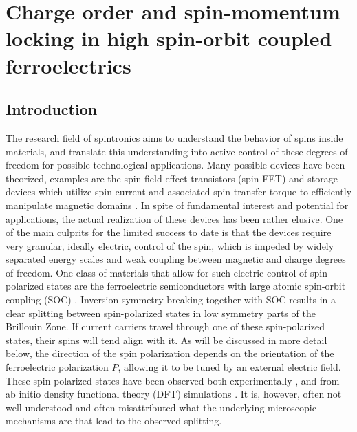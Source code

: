 \newcommand{\unkr}{$u_n(\bm{k}, \bm{r})$}
\newcommand{\Unkr}{u_n(\bm{k}, \bm{r})}
\newcommand{\eikr}{$e^{i\bm{k}\cdot\bm{r}}$}
\newcommand{\Eikr}{e^{i\bm{k}\cdot\bm{r}}}
\chapter{Charge order and spin-momentum locking in high spin-orbit coupled ferroelectrics}
\section{Introduction}
%
The research field of spintronics aims to understand the behavior of spins inside materials, and translate this understanding into active control of these degrees of freedom for possible technological applications.
Many possible devices have been theorized, examples are the spin field-effect transistors (spin-FET)\cite{Datta1990} and storage devices which utilize spin-current and associated spin-transfer torque to efficiently manipulate magnetic domains \cite{Kent2015,Jungwirth2016}. In spite of fundamental interest and potential for applications, the actual realization of these devices has been rather elusive.
One of the main culprits for the limited success to date is that the devices require very granular, ideally electric, control of the spin, which is impeded by widely separated energy scales and weak coupling between magnetic and charge degrees of freedom.
One class of materials that allow for such electric control of spin-polarized states are the ferroelectric semiconductors with large atomic spin-orbit coupling (SOC) \cite{DiSante2013,Ishizaka2011,Kim2014}.
Inversion symmetry breaking together with SOC results in a clear splitting between spin-polarized states in low symmetry parts of the Brillouin Zone. If current carriers travel through one of these spin-polarized states, their spins will tend align with it. As will be discussed in more detail below, the direction of the spin polarization depends on the orientation of the ferroelectric polarization $P$, allowing it to be tuned by an external electric field. These spin-polarized states have been observed both experimentally \cite{Ishizaka2011,Liebmann2016,Krempasky2015SurfaceSemiconductor}, and from ab initio density functional theory (DFT) simulations \cite{DiSante2013}. It is, however, often not well understood and often misattributed what the underlying microscopic mechanisms are that lead to the observed splitting.

